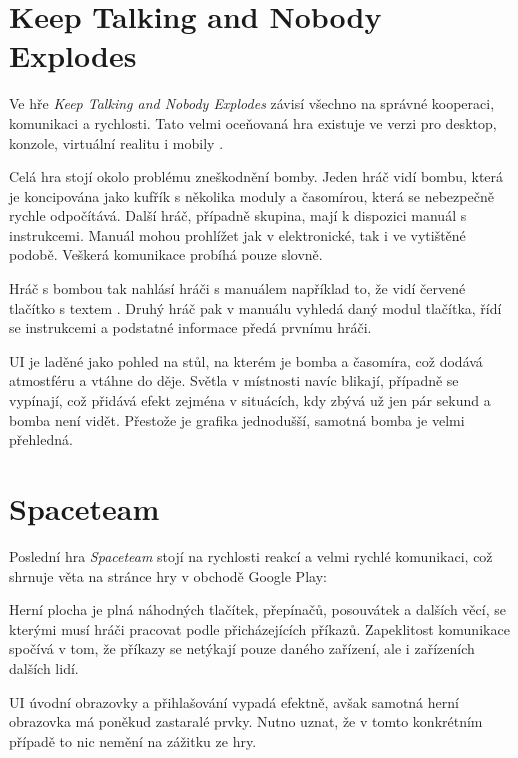 \section{Keep Talking and Nobody Explodes}

Ve hře \emph{Keep Talking and Nobody Explodes} závisí všechno na správné kooperaci, komunikaci a rychlosti. Tato velmi oceňovaná hra existuje ve verzi pro desktop, konzole, virtuální realitu i mobily \cite{steelcrategamesinc_keep}.

Celá hra stojí okolo problému zneškodnění bomby. Jeden hráč vidí bombu, která je koncipována jako kufřík s několika moduly a časomírou, která se nebezpečně rychle odpočítává. Další hráč, případně skupina, mají k dispozici manuál s instrukcemi. Manuál mohou prohlížet jak v elektronické, tak i ve vytištěné podobě. Veškerá komunikace probíhá pouze slovně.

Hráč s bombou tak nahlásí hráči s manuálem například to, že vidí červené tlačítko s textem . Druhý hráč pak v manuálu vyhledá daný modul tlačítka, řídí se instrukcemi a podstatné informace předá prvnímu hráči.

UI je laděné jako pohled na stůl, na kterém je bomba a časomíra, což dodává atmostféru a vtáhne do děje. Světla v místnosti navíc blikají, případně se vypínají, což přidává efekt zejména v situácích, kdy zbývá už jen pár sekund a bomba není vidět. Přestože je grafika jednodušší, samotná bomba je velmi přehledná.

\section{Spaceteam}

Poslední hra \emph{Spaceteam} stojí na rychlosti reakcí a velmi rychlé komunikaci, což shrnuje věta na stránce hry \cite{henrysmithinc_spaceteam} v obchodě Google Play: 

Herní plocha je plná náhodných tlačítek, přepínačů, posouvátek a dalších věcí, se kterými musí hráči pracovat podle přicházejících  příkazů. Zapeklitost komunikace spočívá v tom, že příkazy se netýkají pouze daného zařízení, ale i zařízeních dalších lidí.

UI úvodní obrazovky a přihlašování vypadá efektně, avšak samotná herní obrazovka má poněkud zastaralé prvky. Nutno uznat, že v tomto konkrétním případě to nic nemění na zážitku ze hry.
